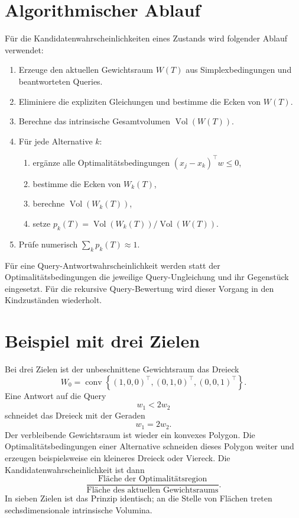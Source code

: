 \documentclass[11pt,a4paper]{article}
\newcommand{\Vol}{\operatorname{Vol}}
\newcommand{\conv}{\operatorname{conv}}
\begin{document}
\section{Algorithmischer Ablauf}

Für die Kandidatenwahrscheinlichkeiten eines Zustands wird folgender Ablauf
verwendet:

\begin{enumerate}
  \item Erzeuge den aktuellen Gewichtsraum $W(T)$ aus Simplexbedingungen und
        beantworteten Queries.
  \item Eliminiere die expliziten Gleichungen und bestimme die Ecken von
        $W(T)$.
  \item Berechne das intrinsische Gesamtvolumen $\Vol(W(T))$.
  \item Für jede Alternative $k$:
    \begin{enumerate}
      \item ergänze alle Optimalitätsbedingungen
            $(x_j-x_k)^\top w\leq 0$,
      \item bestimme die Ecken von $W_k(T)$,
      \item berechne $\Vol(W_k(T))$,
      \item setze
            $p_k(T)=\Vol(W_k(T))/\Vol(W(T))$.
    \end{enumerate}
  \item Prüfe numerisch
        $\sum_k p_k(T)\approx 1$.
\end{enumerate}

Für eine Query-Antwortwahrscheinlichkeit werden statt der
Optimalitätsbedingungen die jeweilige Query-Ungleichung und ihr Gegenstück
eingesetzt. Für die rekursive Query-Bewertung wird dieser Vorgang in den
Kindzuständen wiederholt.

\section{Beispiel mit drei Zielen}

Bei drei Zielen ist der unbeschnittene Gewichtsraum das Dreieck
\[
  W_0
  =
  \conv
  \left\{
    (1,0,0)^\top,
    (0,1,0)^\top,
    (0,0,1)^\top
  \right\}.
\]
Eine Antwort auf die Query
\[
  w_1<2w_2
\]
schneidet das Dreieck mit der Geraden
\[
  w_1=2w_2.
\]
Der verbleibende Gewichtsraum ist wieder ein konvexes Polygon. Die
Optimalitätsbedingungen einer Alternative schneiden dieses Polygon weiter und
erzeugen beispielsweise ein kleineres Dreieck oder Viereck. Die
Kandidatenwahrscheinlichkeit ist dann
\[
  \frac{
    \text{Fläche der Optimalitätsregion}
  }{
    \text{Fläche des aktuellen Gewichtsraums}
  }.
\]
In sieben Zielen ist das Prinzip identisch; an die Stelle von Flächen treten
sechsdimensionale intrinsische Volumina.
\end{document}

